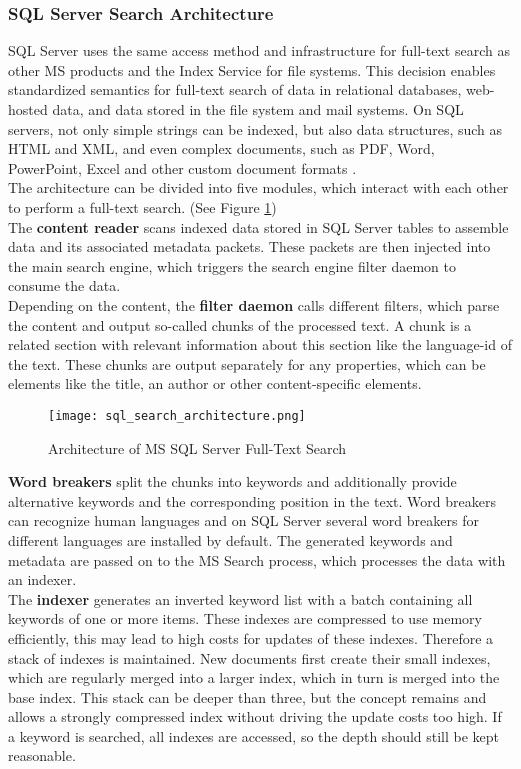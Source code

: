 \subsubsection{SQL Server Search Architecture}
\ac{SQL} Server uses the same access method and infrastructure for full-text search as other \ac{MS} products and the Index Service for file systems. This decision enables standardized semantics for full-text search of data in relational databases, web-hosted data, and data stored in the file system and mail systems. On \ac{SQL} servers, not only simple strings can be indexed, but also data structures, such as HTML and XML, and even complex documents, such as PDF, Word, PowerPoint, Excel and other custom document formats \parencite[cf.][p. 7]{hamilton_microsoft_2001}.\\
The architecture can be divided into five modules, which interact with each other to perform a full-text search. (See Figure \ref{fig:sql_search_architecture})\\
The \textbf{content reader} scans indexed data stored in \ac{SQL} Server tables to assemble data and its associated metadata packets. These packets are then injected into the main search engine, which triggers the search engine filter daemon to consume the data.\\
Depending on the content, the \textbf{filter daemon} calls different filters, which parse the content and output so-called chunks of the processed text. A chunk is a related section with relevant information about this section like the language-id of the text. These chunks are output separately for any properties, which can be elements like the title, an author or other content-specific elements.
\begin{figure}[H]
    \caption{Architecture of MS SQL Server Full-Text Search}
    \label{fig:sql_search_architecture}
    \texttt{[image: sql\_search\_architecture.png]}
    \\
    \cite[Source:][p. 8]{hamilton_microsoft_2001}
\end{figure}
\textbf{Word breakers} split the chunks into keywords and additionally provide alternative keywords and the corresponding position in the text. Word breakers can recognize human languages and on \ac{SQL} Server several word breakers for different languages are installed by default. The generated keywords and metadata are passed on to the \ac{MS} Search process, which processes the data with an indexer.\\
The \textbf{indexer} generates an inverted keyword list with a batch containing all keywords of one or more items. These indexes are compressed to use memory efficiently, this may lead to high costs for updates of these indexes. Therefore a stack of indexes is maintained. New documents first create their small indexes, which are regularly merged into a larger index, which in turn is merged into the base index. This stack can be deeper than three, but the concept remains and allows a strongly compressed index without driving the update costs too high. If a keyword is searched, all indexes are accessed, so the depth should still be kept reasonable.\\
